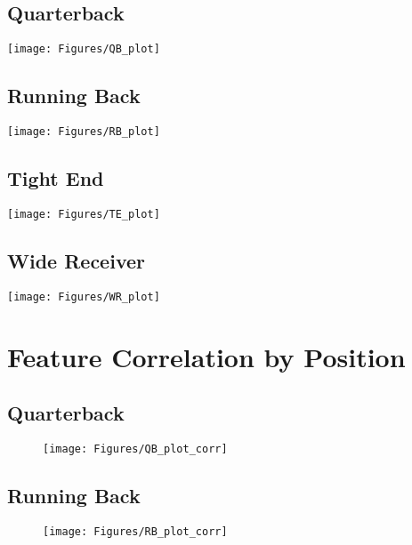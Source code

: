 \subsection{Quarterback}
\begin{flexfigure}[blanker]
	\centering
	\texttt{[image: Figures/QB\_plot]}
	\label{fig:qbplot}
\end{flexfigure}

\subsection{Running Back}
\begin{flexfigure}[blanker]
	\centering
	\texttt{[image: Figures/RB\_plot]}
	\label{fig:rbplot}
\end{flexfigure}


\subsection{Tight End}
\begin{flexfigure}[blanker]
	\centering
	\texttt{[image: Figures/TE\_plot]}
	\label{fig:teplot}
\end{flexfigure}

\subsection{Wide Receiver}
\begin{flexfigure}[blanker]
	\centering
	\texttt{[image: Figures/WR\_plot]}
	\label{fig:wrplot}
\end{flexfigure}


\section{Feature Correlation by Position}
\label{app:positionCorrPlots}

\subsection{Quarterback}
\begin{figure}[h]
	\centering
	\texttt{[image: Figures/QB\_plot\_corr]}
	\label{fig:qbplotcorr}
\end{figure}


\subsection{Running Back}
\begin{figure}[h]
	\centering
	\texttt{[image: Figures/RB\_plot\_corr]}
	\label{fig:rbplotcorr}
\end{figure}

